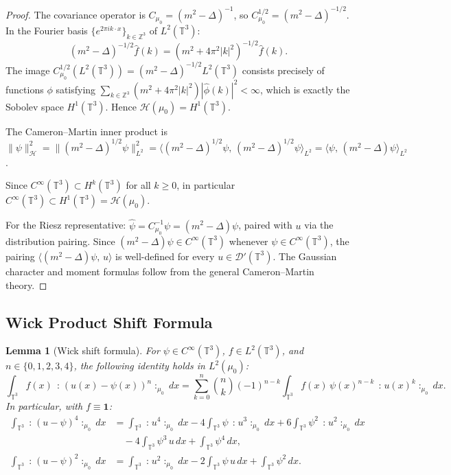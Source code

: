 \documentclass[11pt,a4paper]{article}
\theoremstyle{plain}
\newtheorem{lemma}[theorem]{Lemma}
\theoremstyle{definition}
\newcommand{\T}{\mathbb{T}}
\newcommand{\cD}{\mathcal{D}}
\newcommand{\cH}{\mathcal{H}}
\newcommand{\ip}[2]{\langle #1,\,#2\rangle}
\newcommand{\norm}[1]{\|#1\|}
\newcommand{\wick}[1]{\mathopen{:}\!#1\!\mathclose{:}}
\begin{document}
\begin{proof}
The covariance operator is $C_{\mu_0}=(m^2-\Delta)^{-1}$, so
$C_{\mu_0}^{1/2}=(m^2-\Delta)^{-1/2}$.  In the Fourier basis
$\{e^{2\pi i k\cdot x}\}_{k\in\mathbb{Z}^3}$ of $L^2(\T^3)$:
\[
  (m^2-\Delta)^{-1/2}\hat{f}(k) = (m^2+4\pi^2|k|^2)^{-1/2}\hat{f}(k).
\]
The image $C_{\mu_0}^{1/2}(L^2(\T^3)) = (m^2-\Delta)^{-1/2}L^2(\T^3)$ consists
precisely of functions $\phi$ satisfying
$\sum_{k\in\mathbb{Z}^3}(m^2+4\pi^2|k|^2)|\hat\phi(k)|^2 < \infty$,
which is exactly the Sobolev space $H^1(\T^3)$.
Hence $\cH(\mu_0)=H^1(\T^3)$.

The Cameron--Martin inner product is
$\norm{\psi}_{\cH}^2 = \norm{(m^2-\Delta)^{1/2}\psi}_{L^2}^2
= \ip{(m^2-\Delta)^{1/2}\psi}{(m^2-\Delta)^{1/2}\psi}_{L^2}
= \ip{\psi}{(m^2-\Delta)\psi}_{L^2}$.

Since $C^\infty(\T^3)\subset H^k(\T^3)$ for all $k\ge0$, in particular
$C^\infty(\T^3)\subset H^1(\T^3)=\cH(\mu_0)$.

For the Riesz representative: $\hat\psi = C_{\mu_0}^{-1}\psi = (m^2-\Delta)\psi$,
paired with $u$ via the distribution pairing.  Since
$(m^2-\Delta)\psi\in C^\infty(\T^3)$ whenever $\psi\in C^\infty(\T^3)$,
the pairing $\ip{(m^2-\Delta)\psi}{u}$ is well-defined for every $u\in\cD'(\T^3)$.
The Gaussian character and moment formulas follow from the general Cameron--Martin
theory.
\end{proof}

\subsection{Wick Product Shift Formula}

\begin{lemma}[Wick shift formula]\label{lem:wick-shift}
For $\psi\in C^\infty(\T^3)$, $f\in L^2(\T^3)$, and $n\in\{0,1,2,3,4\}$,
the following identity holds in $L^2(\mu_0)$:
\begin{equation}\label{eq:wick-shift}
  \int_{\T^3} f(x)\,\wick{(u(x)-\psi(x))^n}_{\mu_0}\,dx
  = \sum_{k=0}^{n}\binom{n}{k}(-1)^{n-k}
    \int_{\T^3} f(x)\,\psi(x)^{n-k}\,\wick{u(x)^k}_{\mu_0}\,dx.
\end{equation}
In particular, with $f\equiv\mathbf{1}$:
\begin{align}
  \int_{\T^3}\wick{(u-\psi)^4}_{\mu_0}\,dx
  &= \int_{\T^3}\wick{u^4}_{\mu_0}\,dx
    - 4\int_{\T^3}\psi\,\wick{u^3}_{\mu_0}\,dx
    + 6\int_{\T^3}\psi^2\,\wick{u^2}_{\mu_0}\,dx \nonumber\\
  &\quad - 4\int_{\T^3}\psi^3\,u\,dx
    + \int_{\T^3}\psi^4\,dx, \label{eq:wick4}\\
  \int_{\T^3}\wick{(u-\psi)^2}_{\mu_0}\,dx
  &= \int_{\T^3}\wick{u^2}_{\mu_0}\,dx
    - 2\int_{\T^3}\psi\,u\,dx
    + \int_{\T^3}\psi^2\,dx. \label{eq:wick2}
\end{align}
\end{lemma}
\end{document}
